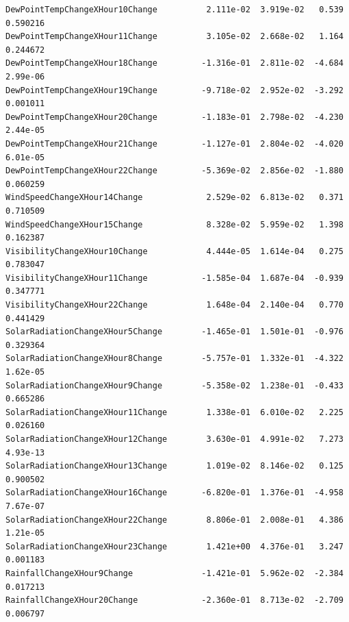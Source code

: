 \documentclass[
  letterpaper,
  DIV=11,
  numbers=noendperiod]{scrartcl}
\begin{document}
\begin{verbatim}
DewPointTempChangeXHour10Change          2.111e-02  3.919e-02   0.539 0.590216
DewPointTempChangeXHour11Change          3.105e-02  2.668e-02   1.164 0.244672
DewPointTempChangeXHour18Change         -1.316e-01  2.811e-02  -4.684 2.99e-06
DewPointTempChangeXHour19Change         -9.718e-02  2.952e-02  -3.292 0.001011
DewPointTempChangeXHour20Change         -1.183e-01  2.798e-02  -4.230 2.44e-05
DewPointTempChangeXHour21Change         -1.127e-01  2.804e-02  -4.020 6.01e-05
DewPointTempChangeXHour22Change         -5.369e-02  2.856e-02  -1.880 0.060259
WindSpeedChangeXHour14Change             2.529e-02  6.813e-02   0.371 0.710509
WindSpeedChangeXHour15Change             8.328e-02  5.959e-02   1.398 0.162387
VisibilityChangeXHour10Change            4.444e-05  1.614e-04   0.275 0.783047
VisibilityChangeXHour11Change           -1.585e-04  1.687e-04  -0.939 0.347771
VisibilityChangeXHour22Change            1.648e-04  2.140e-04   0.770 0.441429
SolarRadiationChangeXHour5Change        -1.465e-01  1.501e-01  -0.976 0.329364
SolarRadiationChangeXHour8Change        -5.757e-01  1.332e-01  -4.322 1.62e-05
SolarRadiationChangeXHour9Change        -5.358e-02  1.238e-01  -0.433 0.665286
SolarRadiationChangeXHour11Change        1.338e-01  6.010e-02   2.225 0.026160
SolarRadiationChangeXHour12Change        3.630e-01  4.991e-02   7.273 4.93e-13
SolarRadiationChangeXHour13Change        1.019e-02  8.146e-02   0.125 0.900502
SolarRadiationChangeXHour16Change       -6.820e-01  1.376e-01  -4.958 7.67e-07
SolarRadiationChangeXHour22Change        8.806e-01  2.008e-01   4.386 1.21e-05
SolarRadiationChangeXHour23Change        1.421e+00  4.376e-01   3.247 0.001183
RainfallChangeXHour9Change              -1.421e-01  5.962e-02  -2.384 0.017213
RainfallChangeXHour20Change             -2.360e-01  8.713e-02  -2.709 0.006797
                                           

\end{verbatim}
\end{document}
